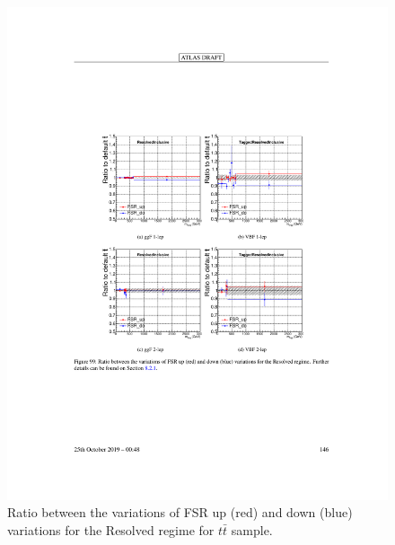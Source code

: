 \begin{figure}[h!]
  \centering
  \includegraphics[width=\hsize]{figures/Analysis/modelingsysts/ttbar_fsr_res.pdf}
            \caption{Ratio between the variations of FSR up (red) and down (blue) variations for the Resolved regime for $t\bar{t}$ sample.} 
  \label{fig:ttbar_fsr_res}
\end{figure} 
\FloatBarrier

